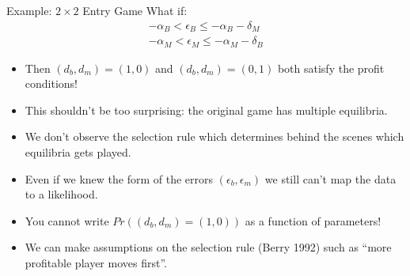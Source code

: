 \documentclass[xcolor=pdftex,dvipsnames,table,mathserif]{beamer}
\begin{document}
\begin{frame}[fragile]{Example: $2 \times 2$ Entry Game}
What if:
\begin{eqnarray*}
-\alpha_B < \epsilon_B \leq -\alpha_B - \delta_M\\
-\alpha_M < \epsilon_M \leq -\alpha_M - \delta_B
\end{eqnarray*}
\begin{itemize}
\item Then $(d_b,d_m) = (1,0)$ and $(d_b,d_m) = (0,1)$ both satisfy the profit conditions!
\item This shouldn't be too surprising: the original game has \alert{multiple equilibria}.
\item We don't observe the \alert{selection rule} which determines behind the scenes which equilibria gets played.
\item Even if we knew the form of the errors $(\epsilon_b,\epsilon_m)$ we still can't map the data to a likelihood.
\item You cannot write $Pr((d_b,d_m) = (1,0))$ as a function of parameters!
\item We can make assumptions on the selection rule (Berry 1992) such as ``more profitable player moves first''.
\end{itemize}
\end{frame}

\end{document}
